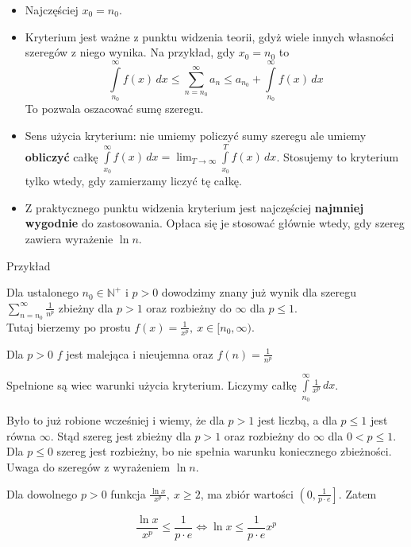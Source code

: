 \begin{itemize}
    \item Najczęściej $ x_0 = n_0 $.
    \item Kryterium jest ważne z punktu widzenia teorii, gdyż wiele innych własności szeregów z niego wynika.
    Na przykład, gdy $x_0 = n_0$ to
    $$ \int\limits_{n_0}^{\infty} f(x) \,dx \leq \sum\limits_{n = n_0}^{\infty} a_n \leq 
    a_{n_0} + \int\limits_{n_0}^{\infty} f(x) \,dx $$
    To pozwala oszacować sumę szeregu.

    \item Sens użycia kryterium: nie umiemy policzyć sumy szeregu ale umiemy \textbf{obliczyć} całkę
    $ \int\limits_{x_0}^{\infty} f(x) \,dx = \lim_{T \to \infty} \int\limits_{x_0}^{T} f(x) \,dx $. Stosujemy to
    kryterium tylko wtedy, gdy zamierzamy liczyć tę całkę.

    \item Z praktycznego punktu widzenia kryterium jest najczęściej \textbf{najmniej wygodnie} do zastosowania.
    Opłaca się je stosować głównie wtedy, gdy szereg zawiera wyrażenie $\ln n$. \\
\end{itemize}

Przykład

Dla ustalonego $ n_0 \in \mathbb{N}^+ $ i $p > 0$ dowodzimy znany już wynik dla szeregu $ \sum\limits_{n = n_0}^{\infty} \frac{1}{n^p} $
zbieżny dla $p > 1$ oraz rozbieżny do $\infty$ dla $p \leq 1$. \\

Tutaj bierzemy po prostu $ f(x) = \frac{1}{x^p}, \ x \in [n_0, \infty) $.

Dla $p > 0$ $f$ jest malejąca i nieujemna oraz $ f(n) = \frac{1}{n^p} $ 

Spełnione są wiec warunki użycia kryterium. Liczymy całkę $ \int\limits_{n_0}^{\infty} \frac{1}{x^p} \,dx $.

Było to już robione wcześniej i wiemy, że dla $p > 1$ jest liczbą, a dla $p \leq 1$ jest równa $\infty$.
Stąd szereg jest zbieżny dla $p > 1$ oraz rozbieżny do $\infty$ dla $0 < p \leq 1$. Dla $p \leq 0$ szereg jest rozbieżny,
bo nie spełnia warunku koniecznego zbieżności. \\

Uwaga do szeregów z wyrażeniem $\ln n$.

Dla dowolnego $p>0$ funkcja $\frac{\ln x}{x^p}, \ x \geq 2$, ma zbiór wartości $\left( 0, \frac{1}{p \cdot e} \right]$. Zatem

$$ \frac{\ln x}{x^p} \leq \frac{1}{p \cdot e} \Leftrightarrow \ln x \leq \frac{1}{p \cdot e} x^p $$

